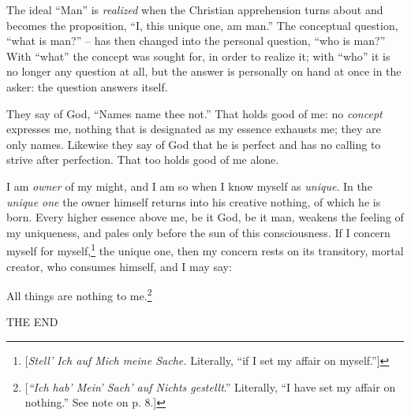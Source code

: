 \documentclass[12pt,a4paper]{book}
\begin{document}
The ideal ``Man'' is \textit{realized} when the Christian apprehension turns 
about and becomes the proposition, ``I, this unique one, am man.'' The 
conceptual question, ``what is man?'' -- has then changed into the personal 
question, ``who is man?'' With ``what'' the concept was sought for, in 
order to realize it; with ``who'' it is no longer any question at all, but 
the answer is personally on hand at once in the asker: the question answers 
itself.

They say of God, ``Names name thee not.'' That holds good of me: no 
\textit{concept} expresses me, nothing that is designated as my essence 
exhausts me; they are only names. Likewise they say of God that he is perfect 
and has no calling to strive after perfection. That too holds good of me 
alone.

I am \textit{owner} of my might, and I am so when I know myself as 
\textit{unique}. In the \textit{unique one} the owner himself returns into his 
creative nothing, of which he is born. Every higher essence above me, be it 
God, be it man, weakens the feeling of my uniqueness, and pales only before 
the sun of this consciousness. If I concern myself for 
myself,\footnote{[\textit{Stell' Ich auf Mich meine Sache.} Literally, ``if I 
set my affair on myself.'']} the unique one, then my concern rests on its 
transitory, mortal creator, who consumes himself, and I may say:

All things are nothing to me.\footnote{[\textit{``Ich hab' Mein' Sach' auf 
Nichts gestellt}.'' Literally, ``I have set my affair on nothing.'' See 
note on p. 8.]}

\begin{center}
THE END\end{center}
\end{document}
